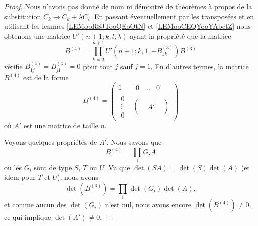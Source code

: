 \begin{proof}
    Nous n'avons pas donné de nom ni démontré de théorèmes à propos de la substitution \( C_k\to C_k+\lambda C_l\). En passant éventuellement par les transposées et en utilisant les lemmes \ref{LEMooRSJTooQEoOtN} et \ref{LEMooCEQYooYAbctZ} nous obtenons une matrice \( U'(n+1;k,l,\lambda)\) ayant la propriété que la matrice
    \begin{equation}
        B^{(4)}=\prod_{k=2}^{n+1}U'(n+1;k,1,-B^{(3)}_{1k})B^{(3)}
    \end{equation}
    vérifie \( B^{(4)}_{1j}=B^{(4)}_{j1}=0\) pour tout \( j\) sauf \( j=1\). En d'autres termes, la matrice \( B^{(4)}\) est de la forme
    \begin{equation}
        B^{(4)}=\begin{pmatrix}
            1    &   \begin{matrix} 
                0    &   \ldots    &   0    
            \end{matrix}\\ 
            \begin{matrix}
                0    \\ 
                \vdots    \\ 
                0    
            \end{matrix}&   \begin{pmatrix}
                    &       &       \\
                    &   A'    &       \\
                    &       &   
            \end{pmatrix}
        \end{pmatrix}
    \end{equation}
    où \( A'\) est une matrice de taille \( n\).
    
    Voyons quelques propriétés de \( A'\). Nous savons que
    \begin{equation}
        B^{(4)}=\prod_i G_iA
    \end{equation}
    où les \( G_i\) sont de type \( S\), \( T\) ou \( U\). Vu que \( \det(SA)=\det(S)\det(A)\) (et idem pour \( T\) et \( U\)), nous avons
    \begin{equation}
        \det(B^{(4)})=\prod_i\det(G_i)\det(A),
    \end{equation}
    et comme aucun des \( \det(G_i)\) n'est nul, nous avons encore \( \det(B^{(4)})\neq 0\), ce qui implique \( \det(A')\neq 0\).


\end{proof}
